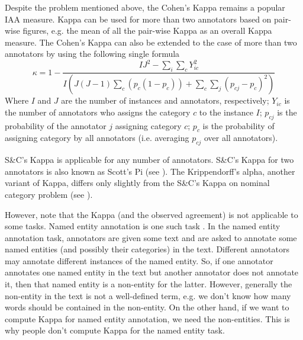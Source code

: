 Despite the problem mentioned above, the Cohen's Kappa remains a popular IAA measure. 
Kappa can be used for more than two annotators based on pair-wise figures, e.g. the mean
of all the pair-wise Kappa as an overall Kappa measure. The Cohen's Kappa can also be
extended to the case of more than two annotators by using the following single 
formula  \cite{Davies82}
\begin{equation}
\kappa = 1-\frac{IJ^{2}-\sum_{i}\sum_{c}Y_{ic}^{2}}
{I(J(J-1)\sum_{c}(p_{c}(1-p_{c}))+ \sum_{c}\sum_{j}(p_{cj}-p_{c})^2)}
\end{equation}
Where $I$ and $J$ are the number of instances and annotators, respectively; $Y_{ic}$ 
is the number of annotators who assigns the category $c$ to the instance $I$; $p_{cj}$ 
is the probability of the annotator $j$ assigning category $c$; $p_{c}$ is the 
probability of assigning category by all annotators (i.e. averaging $p_{cj}$  
over all annotators).

S\&C's Kappa is applicable for any number of annotators. S\&C's Kappa
for two annotators is also known as Scott's Pi (see \cite{Lombard02}). The Krippendorff's 
alpha, another variant of Kappa, differs only slightly from the S\&C's Kappa 
on nominal category problem (see \cite{Carletta96, Eugenio04}).

However, note that the Kappa (and the observed agreement) is not applicable to some
tasks. Named entity annotation is  one such task
\cite{Hripcsak05}. In the named entity annotation task, annotators are given 
some text and are asked to annotate some named entities (and possibly their 
categories) in the text. Different annotators may annotate different instances
of the named entity. So, if one annotator annotates one named entity in the text but
another annotator does not annotate it, then that named entity is a non-entity
for the latter. However, generally the non-entity in the text is not a well-defined 
term, e.g. we don't know how many words should be contained in the non-entity. On the 
other hand, if we want to compute Kappa for named entity annotation, we need
the non-entities. This is why people don't compute Kappa for the named entity task.


%
%
%
